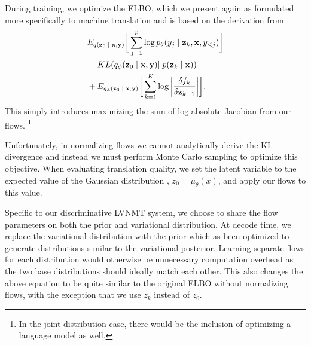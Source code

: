 During training, we optimize the \ac{ELBO}, which we present again as formulated more specifically to machine translation and is based on the derivation from \citealp[Section 4.2]{rezende2015VIwithNF}.
\begin{align}
\begin{split}\label{eq:2}
&
E_{q(\textbf{z}_{0}\; | \;{\textbf{x}, \textbf{y}})} \bigg[ \sum_{j=1}^{p} \log p_{\theta}(y_{j} \; | \;{\textbf{z}_{k}}, \textbf{x}, y_{<j}) \bigg] \\
& - KL(q_{\phi}(\textbf{z}_{0} \; | \;{\textbf{x}, \textbf{y}}) || p(\textbf{z}_{k} \; | \;{\textbf{x}})) \\
&   +  E_{q_{\phi}(\textbf{z}_{0} \; | \;{\textbf{x}, \textbf{y}})} \bigg[\sum_{k=1}^{K} \log \bigg|\frac{\delta f_{k}}{\delta \textbf{z}_{k-1}} \bigg| \bigg].
\end{split}
\end{align}
This simply introduces maximizing the sum of  log absolute Jacobian from our flows. \footnote{In the joint distribution case, there would be the inclusion of optimizing a language model as well.}

Unfortunately, in normalizing flows we cannot analytically derive the KL divergence and instead we must perform Monte Carlo sampling to optimize this objective. When evaluating translation quality, we set the latent variable to the expected value of the Gaussian distribution , $z_{0} = \mu_{\theta}(x)$, and apply our flows to this value.

Specific to our discriminative \ac{LVNMT} system, we choose to share the flow parameters on both the prior and variational distribution. At decode time, we replace the variational distribution with the prior which as been optimized to generate distributions similar to the variational posterior. Learning separate flows for each distribution would otherwise be unnecessary computation overhead as the two base distributions should ideally match each other. This also changes the above equation to be quite similar to the original \ac{ELBO} without normalizing flows, with the exception that we use $z_{k}$ instead of $z_{0}$.









